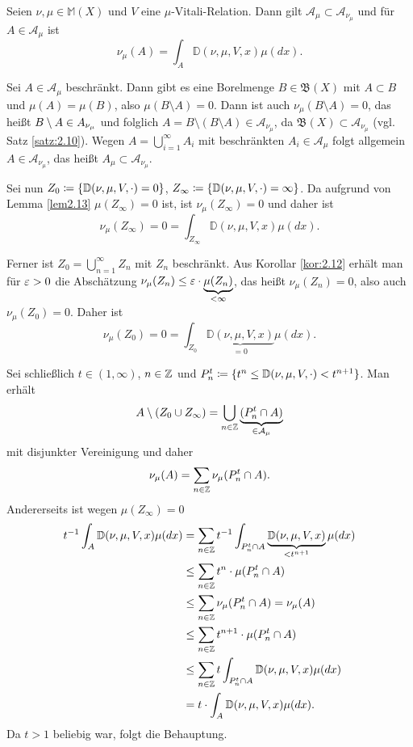 \documentclass[a4paper,twoside,DIV15,BCOR12mm]{scrbook}
\newcommand{\A}{\mathcal A}
\newcommand{\borel}{\mathfrak B}
\begin{document}
\begin{satz}
\label{satz:2.15}
Seien $\nu,\mu\in\mathbb M(X)$ und $V$ eine $\mu$-Vitali-Relation. Dann gilt $\A_\mu \subset \A_{\nu_\mu}$ und für $A\in\A_\mu$ ist
\[
\nu_\mu(A) = \int_A \mathbb D(\nu,\mu,V,x)\mu(dx).
\]
\end{satz}

\begin{beweis}
Sei $A\in\A_\mu$ beschränkt. Dann gibt es eine Borelmenge $B\in\borel(X)$ mit $A\subset B$ und $\mu(A) = \mu(B)$, also $\mu(B\setminus A)=0$.  Dann ist auch $\nu_\mu(B\setminus A) = 0$, das heißt $B\setminus  A \in \mathcal \A_{\nu_\mu}$ und folglich $A = B \setminus (B\setminus A) \in \A_{\nu_\mu}$, da $\borel(X)\subset\A_{\nu_\mu}$ (vgl.
Satz \ref{satz:2.10}). Wegen $A = \bigcup_{i=1}^\infty A_i$ mit beschränkten $A_i \in \A_\mu$ folgt allgemein $A\in\A_{\nu_\mu}$, das heißt $A_\mu\subset\A_{\nu_\mu}$.

Sei nun $Z_0 \da \{ \mathbb D(\nu,\mu,V,\cdot) = 0 \}$, $Z_\infty \da \{ \mathbb D(\nu,\mu,V,\cdot) = \infty \}$. Da aufgrund von Lemma \ref{lem2.13} $\mu(Z_\infty)  = 0$ ist, ist $\nu_\mu(Z_\infty) = 0$ und daher ist
\[
\nu_\mu(Z_\infty) = 0 = \int_{Z_\infty} \mathbb D(\nu,\mu,V,x) \mu(dx).
\]

Ferner ist $Z_0 = \bigcup_{n=1}^\infty Z_n$ mit $Z_n$ beschränkt. Aus Korollar \ref{kor:2.12} erhält man für $\varepsilon>0$ die Abschätzung $\nu_\mu(Z_n) \le \varepsilon \cdot \underbrace{\mu(Z_n)}_{<\infty}$, das heißt $\nu_\mu(Z_n)=0$, also auch $\nu_\mu(Z_0)=0$. Daher ist
\[
\nu_\mu(Z_0) = 0 = \int_{Z_0} \underbrace{\mathbb D(\nu,\mu,V,x)}_{=0} \mu(dx).
\]

Sei schließlich $t\in(1,\infty)$, $n\in\mathbb{Z}$ und $P_n^t \da \{t^n \le \mathbb D(\nu,\mu,V,\cdot) < t^{n+1}\}$. Man erhält
\[
A\setminus(Z_0\cup Z_\infty) = \bigcup_{n\in\MdZ} \underbrace{(P_n^t \cap A)}_{\in\A_\mu}
\]
mit disjunkter Vereinigung und daher 
\[
\nu_\mu(A) = \sum_{n\in\mathbb{Z}}\nu_\mu(P_n^t \cap A).
\]
Andererseits ist wegen $\mu(Z_\infty)=0$
\begin{align*}
t^{-1} \int_A \mathbb D(\nu,\mu,V,x)\mu(dx)
&= \sum_{n\in\mathbb{Z}} t^{-1} \int_{P_n^t\cap A} \underbrace{\mathbb D(\nu,\mu,V,x)}_{<t^{n+1}}\mu(dx) \\
&\le \sum_{n\in\mathbb{Z}} t^n \cdot \mu(P_n^t \cap A) \\
&\le \sum_{n\in\mathbb{Z}} \nu_\mu(P_n^t \cap A) = \nu_\mu(A) \\
&\le \sum_{n\in\mathbb{Z}} t^{n+1}\cdot \mu(P_n^t \cap A) \\
&\le \sum_{n\in\mathbb{Z}} t \int_{P_n^t \cap A} \mathbb D(\nu,\mu,V,x)\mu(dx) \\
&= t \cdot \int_A \mathbb D(\nu,\mu,V,x)\mu(dx).
\end{align*}
Da $t>1$ beliebig war, folgt die Behauptung.
\end{beweis}
\end{document}
